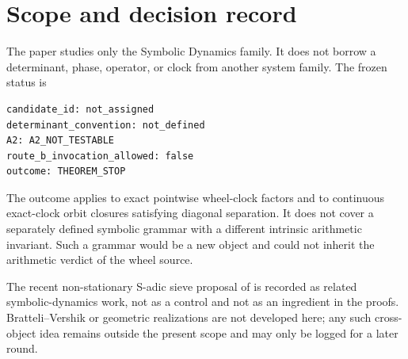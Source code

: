 \section{Scope and decision record}
\label{app:scope}

The paper studies only the Symbolic Dynamics family.  It does not borrow a
determinant, phase, operator, or clock from another system family.  The
frozen status is
\begin{verbatim}
candidate_id: not_assigned
determinant_convention: not_defined
A2: A2_NOT_TESTABLE
route_b_invocation_allowed: false
outcome: THEOREM_STOP
\end{verbatim}

The outcome applies to exact pointwise wheel-clock factors and to continuous
exact-clock orbit closures satisfying diagonal separation.  It does not
cover a separately defined symbolic grammar with a different intrinsic
arithmetic invariant.  Such a grammar would be a new object and could not
inherit the arithmetic verdict of the wheel source.

The recent non-stationary S-adic sieve proposal of \citet{heeren2026} is
recorded as related symbolic-dynamics work, not as a control and not as an
ingredient in the proofs.  Bratteli--Vershik or geometric realizations are
not developed here; any such cross-object idea remains outside the present
scope and may only be logged for a later round.
